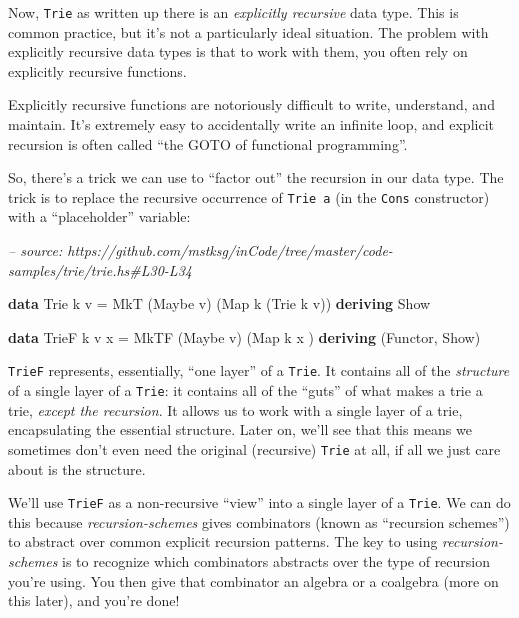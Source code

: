 \documentclass[]{article}
\newenvironment{Shaded}{}{}
\newcommand{\CommentTok}[1]{\textcolor[rgb]{0.38,0.63,0.69}{\textit{#1}}}
\newcommand{\DataTypeTok}[1]{\textcolor[rgb]{0.56,0.13,0.00}{#1}}
\newcommand{\FunctionTok}[1]{\textcolor[rgb]{0.02,0.16,0.49}{#1}}
\newcommand{\KeywordTok}[1]{\textcolor[rgb]{0.00,0.44,0.13}{\textbf{#1}}}
\newcommand{\NormalTok}[1]{#1}
\begin{document}
Now, \texttt{Trie} as written up there is an \emph{explicitly recursive} data
type. This is common practice, but it's not a particularly ideal situation. The
problem with explicitly recursive data types is that to work with them, you
often rely on explicitly recursive functions.

Explicitly recursive functions are notoriously difficult to write, understand,
and maintain. It's extremely easy to accidentally write an infinite loop, and
explicit recursion is often called ``the GOTO of functional programming''.

So, there's a trick we can use to ``factor out'' the recursion in our data type.
The trick is to replace the recursive occurrence of \texttt{Trie\ a} (in the
\texttt{Cons} constructor) with a ``placeholder'' variable:

\begin{Shaded}
\begin{Highlighting}[]
\CommentTok{-- source: https://github.com/mstksg/inCode/tree/master/code-samples/trie/trie.hs#L30-L34}

\KeywordTok{data} \DataTypeTok{Trie}\NormalTok{  k v   }\FunctionTok{=} \DataTypeTok{MkT}\NormalTok{  (}\DataTypeTok{Maybe}\NormalTok{ v) (}\DataTypeTok{Map}\NormalTok{ k (}\DataTypeTok{Trie}\NormalTok{ k v))}
  \KeywordTok{deriving} \DataTypeTok{Show}

\KeywordTok{data} \DataTypeTok{TrieF}\NormalTok{ k v x }\FunctionTok{=} \DataTypeTok{MkTF}\NormalTok{ (}\DataTypeTok{Maybe}\NormalTok{ v) (}\DataTypeTok{Map}\NormalTok{ k x         )}
  \KeywordTok{deriving}\NormalTok{ (}\DataTypeTok{Functor}\NormalTok{, }\DataTypeTok{Show}\NormalTok{)}
\end{Highlighting}
\end{Shaded}

\texttt{TrieF} represents, essentially, ``one layer'' of a \texttt{Trie}. It
contains all of the \emph{structure} of a single layer of a \texttt{Trie}: it
contains all of the ``guts'' of what makes a trie a trie, \emph{except the
recursion}. It allows us to work with a single layer of a trie, encapsulating
the essential structure. Later on, we'll see that this means we sometimes don't
even need the original (recursive) \texttt{Trie} at all, if all we just care
about is the structure.

We'll use \texttt{TrieF} as a non-recursive ``view'' into a single layer of a
\texttt{Trie}. We can do this because \emph{recursion-schemes} gives combinators
(known as ``recursion schemes'') to abstract over common explicit recursion
patterns. The key to using \emph{recursion-schemes} is to recognize which
combinators abstracts over the type of recursion you're using. You then give
that combinator an algebra or a coalgebra (more on this later), and you're done!
\end{document}
